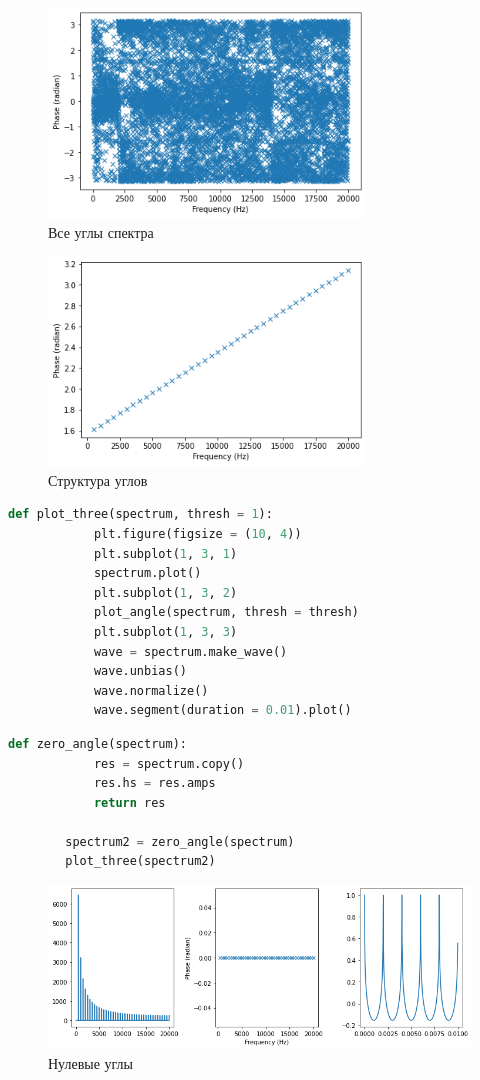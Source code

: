 \documentclass[a4paper, 12pt]{report}
\begin{document}
	\begin{figure}[H]
		\centering
		\includegraphics[width=0.75\textwidth]{test3.png}
		\caption{Все углы спектра}
		\label{fig:test3}
	\end{figure}
	\begin{figure}[H]
		\centering
		\includegraphics[width=0.75\textwidth]{test4.png}
		\caption{Структура углов}
		\label{fig:test4}
	\end{figure}
	\begin{lstlisting}[language=Python,caption=Функция для 3-х графиков]
		def plot_three(spectrum, thresh = 1):
			plt.figure(figsize = (10, 4))
			plt.subplot(1, 3, 1)
			spectrum.plot()
			plt.subplot(1, 3, 2)
			plot_angle(spectrum, thresh = thresh)
			plt.subplot(1, 3, 3)
			wave = spectrum.make_wave()
			wave.unbias()
			wave.normalize()
			wave.segment(duration = 0.01).plot()
	\end{lstlisting}
	\begin{lstlisting}[language=Python,caption=Все углы равны нулю]
		def zero_angle(spectrum):
			res = spectrum.copy()
			res.hs = res.amps
			return res
		
		spectrum2 = zero_angle(spectrum)
		plot_three(spectrum2)
	\end{lstlisting}
	\begin{figure}[H]
		\centering
		\includegraphics[width=1.0\textwidth]{test5.png}
		\caption{Нулевые углы}
		\label{fig:test5}
	\end{figure}
\end{document}
